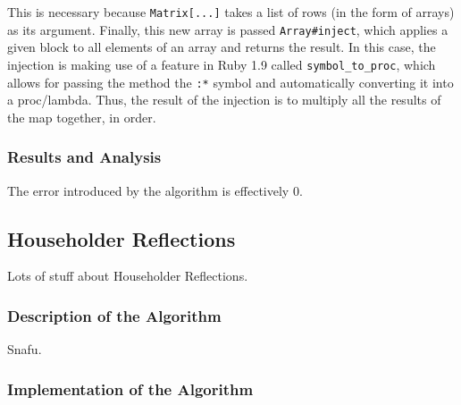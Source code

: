 \documentclass[letterpaper,12pt]{article}
\begin{document}
This is necessary because \texttt{Matrix[...]} takes a list of rows (in the
form of arrays) as its argument.
Finally, this new array is passed \texttt{Array\#inject}, which applies a given
block to all elements of an array and returns the result.
In this case, the injection is making use of a feature in Ruby 1.9 called
\texttt{symbol\_to\_proc}, which allows for passing the method the \texttt{:*}
symbol and automatically converting it into a proc/lambda.
Thus, the result of the injection is to multiply all the results of the map
together, in order.

\subsubsection{Results and Analysis}

The error introduced by the algorithm is effectively $0$.

\subsection{Householder Reflections}

Lots of stuff about Householder Reflections.

\subsubsection{Description of the Algorithm}

Snafu.

\subsubsection{Implementation of the Algorithm}
\end{document}
